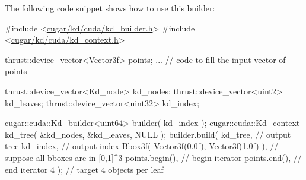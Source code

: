 \begin{DoxyParagraph}{}
The following code snippet shows how to use this builder\+: 
\begin{DoxyCode}
\textcolor{preprocessor}{#include <\hyperlink{kd__builder_8h}{cugar/kd/cuda/kd\_builder.h}>}
\textcolor{preprocessor}{#include <\hyperlink{kd__context_8h}{cugar/kd/cuda/kd\_context.h}>}

thrust::device\_vector<Vector3f> points;
... \textcolor{comment}{// code to fill the input vector of points}

thrust::device\_vector<Kd\_node>  kd\_nodes;
thrust::device\_vector<uint2>    kd\_leaves;
thrust::device\_vector<uint32>   kd\_index;

\hyperlink{structcugar_1_1cuda_1_1_kd__builder}{cugar::cuda::Kd\_builder<uint64>} builder( kd\_index );
\hyperlink{structcugar_1_1cuda_1_1_kd__context}{cugar::cuda::Kd\_context} kd\_tree( &kd\_nodes, &kd\_leaves, NULL );
builder.build(
    kd\_tree,                                    \textcolor{comment}{// output tree}
    kd\_index,                                   \textcolor{comment}{// output index}
    Bbox3f( Vector3f(0.0f), Vector3f(1.0f) ),   \textcolor{comment}{// suppose all bboxes are in [0,1]^3}
    points.begin(),                             \textcolor{comment}{// begin iterator}
    points.end(),                               \textcolor{comment}{// end iterator}
    4 );                                        \textcolor{comment}{// target 4 objects per leaf}
\end{DoxyCode}

\end{DoxyParagraph}
